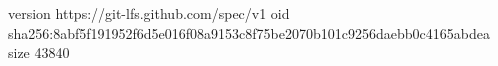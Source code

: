 version https://git-lfs.github.com/spec/v1
oid sha256:8abf5f191952f6d5e016f08a9153c8f75be2070b101c9256daebb0c4165abdea
size 43840
